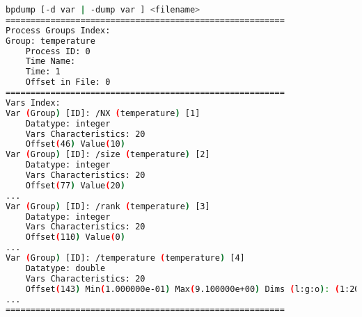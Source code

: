 \begin{lstlisting}[language=bash,caption={bpdump utility},label={list-bpdump}]
bpdump [-d var | -dump var ] <filename>
======================================================== 
Process Groups Index:
Group: temperature
    Process ID: 0 
    Time Name:
    Time: 1 
    Offset in File: 0
========================================================
Vars Index:
Var (Group) [ID]: /NX (temperature) [1]
    Datatype: integer
    Vars Characteristics: 20
    Offset(46) Value(10)
Var (Group) [ID]: /size (temperature) [2] 
    Datatype: integer
    Vars Characteristics: 20 
    Offset(77) Value(20)
...
Var (Group) [ID]: /rank (temperature) [3] 
    Datatype: integer
    Vars Characteristics: 20 
    Offset(110) Value(0)
...
Var (Group) [ID]: /temperature (temperature) [4] 
    Datatype: double
    Vars Characteristics: 20
    Offset(143) Min(1.000000e-01) Max(9.100000e+00) Dims (l:g:o): (1:20:0,10:10:0)
...
========================================================
\end{lstlisting}


